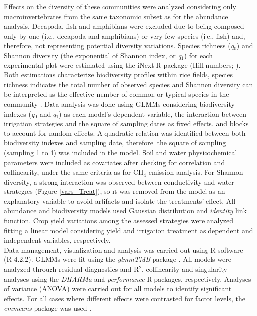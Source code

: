 Effects on the diversity of these communities were analyzed considering only macroinvertebrates from the same taxonomic subset as for the abundance analysis. Decapoda, fish and amphibians were excluded due to being composed only by one (i.e., decapoda and amphibians) or very few species (i.e., fish) and, therefore, not representing potential diversity variations. Species richness (\textit{q$_{0}$}) and Shannon diversity (the exponential of  Shannon index, or \textit{q$_{1}$}) for each experimental plot were estimated using the iNext R package (Hill numbers; \cite{chao2014a, hsieh2016}). Both estimations characterize biodiversity profiles within rice fields, species richness indicates the total number of observed species and Shannon diversity can be interpreted as the effective number of common or typical species in the community \citep{chao2014}. Data analysis was done using GLMMs considering biodiversity indexes (\textit{q$_{0}$} and \textit{q$_{1}$}) as each model's dependent variable, the interaction between irrigation strategies and the square of sampling dates as fixed effects, and blocks to account for random effects. A quadratic relation was identified between both biodiversity indexes and sampling date, therefore, the square of sampling (sampling 1 to 4) was included in the model. Soil and water physicochemical parameters were included as covariates after checking for correlation and collinearity, under the same criteria as for CH$_{4}$ emission analysis. For Shannon diversity, a strong interaction was observed between conductivity and water strategies (Figure \ref{vars_Treat}), so it was removed from the model as an explanatory variable to avoid artifacts and isolate the treatments' effect. All abundance and biodiversity models used Gaussian distribution and \textit{identity} link function. Crop yield variations among the assessed strategies were analyzed fitting a linear model considering yield and irrigation treatment as dependent and independent variables, respectively.\\

Data management, visualization and analysis was carried out using R software (R-4.2.2). GLMMs were fit using the \textit{glmmTMB} package \citep{brooks2017}. All models were analyzed through residual diagnostics and R$^{2}$, collinearity and singularity analyses using the \textit{DHARMa} \citep{hartig2018dharma} and \textit{performance} \citep{ludecke2021} R packages, respectively. Analyses of variance (ANOVA) were carried out for all models to identify significant effects. For all cases where different effects were contrasted for factor levels, the \textit{emmeans} package was used \citep{lenth2017}.  

